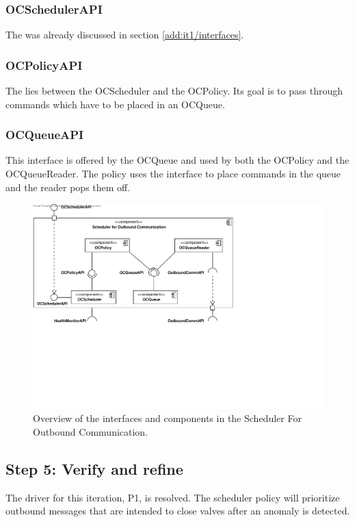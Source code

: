 \subsubsection{OCSchedulerAPI}

\npar The  was already discussed in section
\ref{add:it1/interfaces}.

\subsubsection{OCPolicyAPI}

\npar The  lies between the OCScheduler and the OCPolicy.
Its goal is to pass through commands which have to be placed in an OCQueue.

\subsubsection{OCQueueAPI}

\npar This interface is offered by the OCQueue and used by both the OCPolicy and
the OCQueueReader. The policy uses the interface to place commands in the queue
and the reader pops them off.

\begin{figure}[H]
	\begin{centering}
		\includegraphics[width=\textwidth]{figs/add-it7-interfaces.pdf}
		\caption{Overview of the interfaces and components in the Scheduler For
		Outbound Communication.}
		\label{fig:it7/interfaces}
	\end{centering}
\end{figure}

\subsection{Step 5: Verify and refine}
\label{add:it7/verification}

\npar The driver for this iteration, P1, is resolved. The scheduler policy will
prioritize outbound messages that are intended to close valves after an anomaly
is detected.
